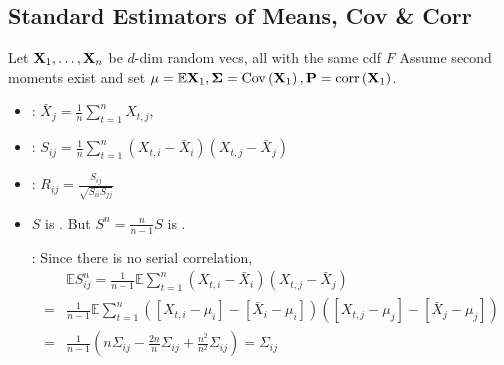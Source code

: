 \subsection*{Standard Estimators of Means, Cov \& Corr}
Let $\boldsymbol{\mathbf{X}}_{1}, \ldots, \boldsymbol{\mathbf{X}}_{n}$ be  $d$-dim random vecs, all with the same cdf $F$ Assume second moments exist and set
$
\mu=\mathbb{E} \boldsymbol{\mathbf{X}}_{1}, \boldsymbol{\mathbf{\Sigma}}=\operatorname{Cov}\left(\boldsymbol{\mathbf{X}}_{1}\right), \boldsymbol{\mathbf{P}}=\operatorname{corr}\left(\boldsymbol{\mathbf{X}}_{1}\right)
$.
\begin{itemize}[leftmargin=*]
    \item {}: $\bar{X}_{j}=\frac{1}{n} \sum_{t=1}^{n} X_{t, j}$, 
    \item {}: $S_{i j} =\frac{1}{n} \sum_{t=1}^{n}\left(X_{t, i}-\bar{X}_{i}\right)\left(X_{t, j}-\bar{X}_{j}\right)$
    \item {}: $R_{i j} =\frac{S_{i j}}{\sqrt{S_{i i} S_{j j}}} $
    \item $S$ is . But $S^{n}=\frac{n}{n-1} S$ is .

: Since there is no serial correlation,
$$
\begin{aligned}
& \mathbb{E} S_{i j}^{n}=\frac{1}{n-1} \mathbb{E} \sum_{t=1}^{n}\left(X_{t, i}-\bar{X}_{i}\right)\left(X_{t, j}-\bar{X}_{j}\right) \\
=& \frac{1}{n-1} \mathbb{E} \sum_{t=1}^{n}\left(\left[X_{t, i}-\mu_{i}\right]-\left[\bar{X}_{i}-\mu_{i}\right]\right)\left(\left[X_{t, j}-\mu_{j}\right]-\left[\bar{X}_{j}-\mu_{j}\right]\right) \\
=& \frac{1}{n-1}\left(n \Sigma_{i j}-\frac{2 n}{n} \Sigma_{i j}+\frac{n^{2}}{n^{2}} \Sigma_{i j}\right)=\Sigma_{i j}
\end{aligned}
$$
\end{itemize}







